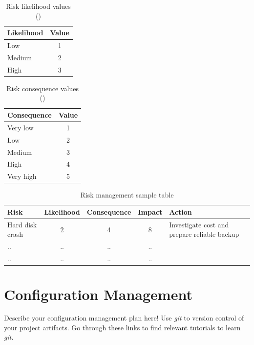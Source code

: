 \documentclass[12pt, a4paper]{report}
\begin{document}
\begin{table}[htb!]
  \centering
\begin{tabular}{l|c}
  \bf{Likelihood} & \bf{Value}\\ \hline\hline
  Low & 1 \\ \hline
  Medium & 2 \\ \hline
  High & 3 \\ \hline
\end{tabular}
  \caption{Risk likelihood values (\cite{dawson2005projects})}
  \label{tab:likelihood}
\end{table}

\begin{table}[htb!]
  \centering
\begin{tabular}{l|c}
  \bf{Consequence} & \bf{Value} \\ \hline\hline
  Very low & 1 \\ \hline
  Low & 2 \\ \hline
  Medium & 3 \\ \hline
  High & 4 \\ \hline
  Very high & 5 \\ \hline
\end{tabular}
  \caption{Risk consequence values (\cite{dawson2005projects})}
  \label{tab:consequence}
\end{table}


\begin{table}[htb!]
	\centering
\begin{tabular}{l|c|c|c|p{4cm}}
	\bf{Risk} & \bf{Likelihood} &\bf{Consequence} &\bf{Impact} &\bf{Action}\\ \hline\hline
Hard disk crash & 2 & 4 & 8 & Investigate cost and prepare reliable backup\\ \hline
.. & .. & .. & .. \\ \hline
.. & .. & .. & ..\\ \hline
\end{tabular}
  \caption{Risk management sample table}
  \label{tab:risk_impact}
\end{table}

\chapter{Configuration Management} %
\label{cha:configuration_management}
Describe your configuration management plan here! 
Use \emph{git} to version control of your project artifacts. Go through these links to find relevant tutorials to learn \emph{git}.
\end{document}
